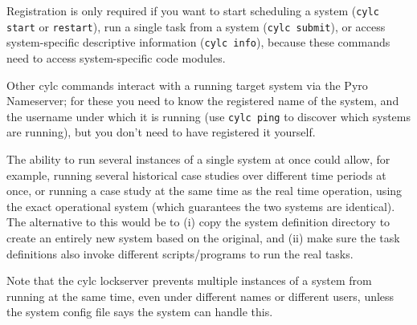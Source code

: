 Registration is only required if you want to start scheduling a system
(\lstinline=cylc start= or \lstinline=restart=), run a single task
from a system (\lstinline=cylc submit=), or access system-specific
descriptive information (\lstinline=cylc info=), because these
commands need to access system-specific code modules.

Other cylc commands interact with a running target system via the Pyro
Nameserver; for these you need to know the registered name of the
system, and the username under which it is running (use 
\lstinline=cylc ping= to discover which systems are running), but you
don't need to have registered it yourself. 

The ability to run several instances of a single system at once could
allow, for example, running several historical case studies over
different time periods at once, or running a case study at the same time
as the real time operation, using the exact operational system (which
guarantees the two systems are identical). The alternative to this would
be to (i) copy the system definition directory to create an entirely new
system based on the original, and (ii) make sure the task definitions
also invoke different scripts/programs to run the real tasks.

Note that the cylc lockserver prevents multiple instances of a system
from running at the same time, even under different names or different
users, unless the system config file says the system can handle this.
